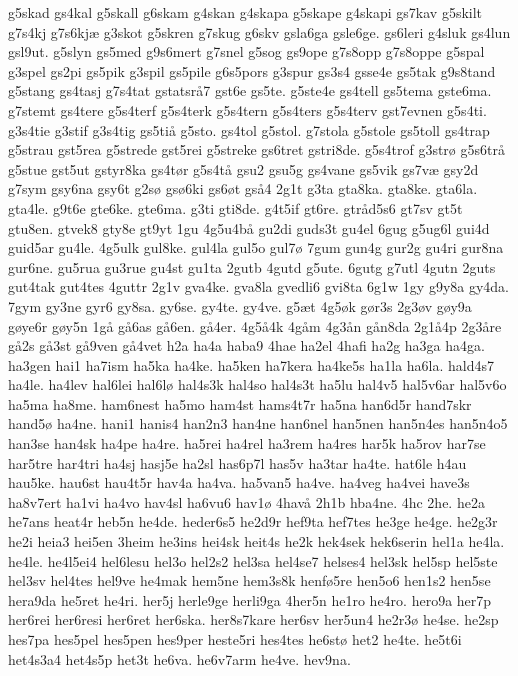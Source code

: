 {g5skad
gs4kal
g5skall
g6skam
g4skan
g4skapa
g5skape
g4skapi
gs7kav
g5skilt
g7s4kj
g7s6kjæ
g3skot
g5skren
g7skug
g6skv
gsla6ga
gsle6ge.
gs6leri
g4sluk
gs4lun
gsl9ut.
g5slyn
gs5med
g9s6mert
g7snel
g5sog
gs9ope
g7s8opp
g7s8oppe
g5spal
g3spel
gs2pi
gs5pik
g3spil
gs5pile
g6s5pors
g3spur
gs3s4
gsse4e
gs5tak
g9s8tand
g5stang
gs4tasj
g7s4tat
gstatsrå7
gst6e
gs5te.
g5ste4e
gs4tell
gs5tema
gste6ma.
g7stemt
gs4tere
g5s4terf
g5s4terk
g5s4tern
g5s4ters
g5s4terv
gst7evnen
g5s4ti.
g3s4tie
g3stif
g3s4tig
gs5tiå
g5sto.
gs4tol
g5stol.
g7stola
g5stole
gs5toll
gs4trap
g5strau
gst5rea
g5strede
gst5rei
g5streke
gs6tret
gstri8de.
g5s4trof
g3strø
g5s6trå
g5stue
gst5ut
gstyr8ka
gs4tør
g5s4tå
gsu2
gsu5g
gs4vane
gs5vik
gs7væ
gsy2d
g7sym
gsy6na
gsy6t
g2sø
gsø6ki
gs6øt
gså4
2g1t
g3ta
gta8ka.
gta8ke.
gta6la.
gta4le.
g9t6e
gte6ke.
gte6ma.
g3ti
gti8de.
g4t5if
gt6re.
gtråd5s6
gt7sv
gt5t
gtu8en.
gtvek8
gty8e
gt9yt
1gu
4g5u4bå
gu2di
guds3t
gu4el
6gug
g5ug6l
gui4d
guid5ar
gu4le.
4g5ulk
gul8ke.
gul4la
gul5o
gul7ø
7gum
gun4g
gur2g
gu4ri
gur8na
gur6ne.
gu5rua
gu3rue
gu4st
gu1ta
2gutb
4gutd
g5ute.
6gutg
g7utl
4gutn
2guts
gut4tak
gut4tes
4guttr
2g1v
gva4ke.
gva8la
gvedli6
gvi8ta
6g1w
1gy
g9y8a
gy4da.
7gym
gy3ne
gyr6
gy8sa.
gy6se.
gy4te.
gy4ve.
g5æt
4g5øk
gør3s
2g3øv
gøy9a
gøye6r
gøy5n
1gå
gå6as
gå6en.
gå4er.
4g5å4k
4gåm
4g3ån
gån8da
2g1å4p
2g3åre
gå2s
gå3st
gå9ven
gå4vet
h2a
ha4a
haba9
4hae
ha2el
4hafi
ha2g
ha3ga
ha4ga.
ha3gen
hai1
ha7ism
ha5ka
ha4ke.
ha5ken
ha7kera
ha4ke5s
ha1la
ha6la.
hald4s7
ha4le.
ha4lev
hal6lei
hal6lø
hal4s3k
hal4so
hal4s3t
ha5lu
hal4v5
hal5v6ar
hal5v6o
ha5ma
ha8me.
ham6nest
ha5mo
ham4st
hams4t7r
ha5na
han6d5r
hand7skr
hand5ø
ha4ne.
hani1
hanis4
han2n3
han4ne
han6nel
han5nen
han5n4es
han5n4o5
han3se
han4sk
ha4pe
ha4re.
ha5rei
ha4rel
ha3rem
ha4res
har5k
ha5rov
har7se
har5tre
har4tri
ha4sj
hasj5e
ha2sl
has6p7l
has5v
ha3tar
ha4te.
hat6le
h4au
hau5ke.
hau6st
hau4t5r
hav4a
ha4va.
ha5van5
ha4ve.
ha4veg
ha4vei
have3s
ha8v7ert
ha1vi
ha4vo
hav4sl
ha6vu6
hav1ø
4havå
2h1b
hba4ne.
4hc
2he.
he2a
he7ans
heat4r
heb5n
he4de.
heder6s5
he2d9r
hef9ta
hef7tes
he3ge
he4ge.
he2g3r
he2i
heia3
hei5en
3heim
he3ins
hei4sk
heit4s
he2k
hek4sek
hek6serin
hel1a
he4la.
he4le.
he4l5ei4
hel6lesu
hel3o
hel2s2
hel3sa
hel4se7
helses4
hel3sk
hel5sp
hel5ste
hel3sv
hel4tes
hel9ve
he4mak
hem5ne
hem3s8k
henfø5re
hen5o6
hen1s2
hen5se
hera9da
he5ret
he4ri.
her5j
herle9ge
herli9ga
4her5n
he1ro
he4ro.
hero9a
her7p
her6rei
her6resi
her6ret
her6ska.
her8s7kare
her6sv
her5un4
he2r3ø
he4se.
he2sp
hes7pa
hes5pel
hes5pen
hes9per
heste5ri
hes4tes
he6stø
het2
he4te.
he5t6i
het4s3a4
het4s5p
het3t
he6va.
he6v7arm
he4ve.
hev9na.
}
